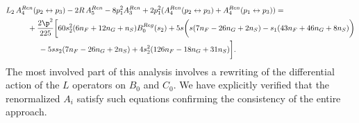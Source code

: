 \documentclass[a4paper,11pt,openright,twoside]{book}
\numberwithin{equation}{section}
\begin{document}
{{\begin{align}
	&L_2\,A^{Ren}_4(p_2\leftrightarrow p_3)-2R\,A^{Ren}_5-8p_1^2A^{Ren}_3+2p_1^2(A^{Ren}_4(p_2\leftrightarrow p_3)+A^{Ren}_4(p_1\leftrightarrow p_3))=\notag\\
	&\hspace{+1cm}+\frac{2\p^2}{225} \bigg[60 s_2^2(6 n_F+12 n_G+n_S)B_0^{Reg}(s_2) +5 s \bigg(s (7 n_F-26 n_G+2 n_S)-s_1 (43 n_F+46 n_G+8 n_S)\bigg)\notag\\
	&\hspace{+1.5cm}-5 s s_2 (7 n_F-26 n_G+2 n_S)+4 s_2^2 (126 n_F-18 n_G+31 n_S)\bigg].
\end{align}
The most involved part of this analysis involves a rewriting of the differential action of the $L$ operators on $B_0$ and $C_0$. 
We have explicitly verified that the renormalized $A_i$ satisfy such equations confirming the consistency of the entire approach. 
}}
\end{document}
